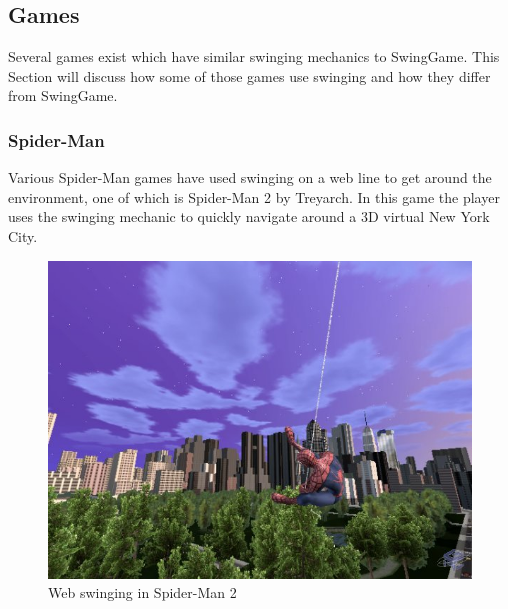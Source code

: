 \documentclass[]{report}
\begin{document}
		\subsection{Games}
		Several games exist which have similar swinging mechanics to SwingGame. This Section will discuss how some of those games use swinging and how they differ from SwingGame.
			\subsubsection{Spider-Man}
			Various Spider-Man games have used swinging on a web line to get around the environment, one of which is Spider-Man 2 \cite{spiderman} by Treyarch. In this game the player uses the swinging mechanic to quickly navigate around a 3D virtual New York City.
			
			\begin{figure}[H]
				\centering
				\includegraphics[scale=1.8]{spiderman}
				\caption{Web swinging in Spider-Man 2 \cite{spidermanimage}}
				\label{spidermanimage}
			\end{figure}
\end{document}
